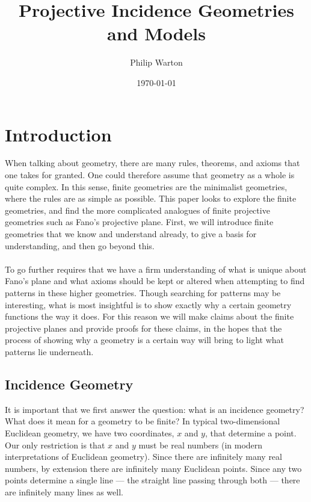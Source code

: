 \documentclass{article}
\begin{document}
\title{Projective Incidence Geometries and Models}
\author{Philip Warton}
\date{\today}
\maketitle
\tableofcontents
\newpage
\section{Introduction}

When talking about geometry, there are many rules, theorems, and axioms that one takes for granted. One could therefore assume that geometry as a whole is quite complex. In this sense, finite geometries are the minimalist geometries, where the rules are as simple as possible. This paper looks to explore the finite geometries, and find the more complicated analogues of finite projective geometries such as Fano's projective plane. First, we will introduce finite geometries that we know and understand already,  to give a basis for understanding, and then go beyond this. \\\\
To go further requires that we have a firm understanding of what is unique about Fano's plane and what axioms should be kept or altered when attempting to find patterns in these higher geometries. Though searching for patterns may be interesting, what is most insightful is to show exactly why a certain geometry functions the way it does. For this reason we will make claims about the finite projective planes and provide proofs for these claims, in the hopes that the process of showing why a geometry is a certain way will bring to light what patterns lie underneath.
\subsection{Incidence Geometry}
It is important that we first answer the question: what is an incidence geometry? What does it mean for a geometry to be finite? In typical two-dimensional Euclidean geometry, we have two coordinates, $x$ and $y$, that determine a point. Our only restriction is that $x$ and $y$ must be real numbers (in modern interpretations of Euclidean geometry). Since there are infinitely many real numbers, by extension there are infinitely many Euclidean points. Since any two points determine a single line --- the straight line passing through both --- there are infinitely many lines as well. \\
\end{document}
